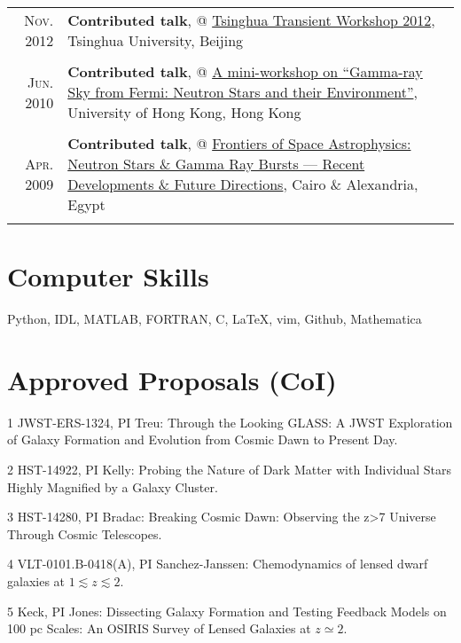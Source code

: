\documentclass[letterpaper,12pt]{article}
\newcommand{\textwrap}{5.3in}
\begin{document}
\begin{longtable}{r|p{\textwrap}}
    \textsc{Nov. 2012}   &   \textbf{Contributed talk}, @ \href{http://www.phys.tsinghua.edu.cn/publish/phy/5287/2012/20121102084855753317440/20121102084855753317440_.html}{Tsinghua Transient Workshop 2012}, Tsinghua University, Beijing   \\
    \multicolumn{2}{c}{} \\

    \textsc{Jun. 2010}   &   \textbf{Contributed talk}, @ \href{http://www.physics.hku.hk/~astro/2010Astro/Index.htm}{A mini-workshop on ``Gamma-ray Sky from Fermi: Neutron Stars and their Environment''}, University of Hong Kong, Hong Kong   \\
    \multicolumn{2}{c}{} \\

    \textsc{Apr. 2009}   &   \textbf{Contributed talk}, @ \href{http://www.ns-grb.com/index0.html}{Frontiers of Space Astrophysics: Neutron Stars \& Gamma Ray Bursts --- Recent Developments \& Future Directions}, Cairo \& Alexandria, Egypt     \\
    \multicolumn{2}{c}{}

\end{longtable}
\endgroup

\section{Computer Skills}
\hspace*{0em}
Python, IDL, MATLAB, FORTRAN, C, \LaTeX, vim, Github, Mathematica


\section{Approved Proposals (CoI)}

\begin{list}{}{\leftmargin=1.7em}
    \item[1] JWST-ERS-1324, PI Treu: Through the Looking GLASS: A JWST Exploration of Galaxy Formation and Evolution from Cosmic Dawn to Present Day.
    \item[2] HST-14922, PI Kelly: Probing the Nature of Dark Matter with Individual Stars Highly Magnified by a Galaxy Cluster.
    \item[3] HST-14280, PI Bradac: Breaking Cosmic Dawn: Observing the z>7 Universe Through Cosmic Telescopes.
    \item[4] VLT-0101.B-0418(A), PI Sanchez-Janssen: Chemodynamics of lensed dwarf galaxies at $1\lesssim z\lesssim 2$.
    \item[5] Keck, PI Jones: Dissecting Galaxy Formation and Testing Feedback Models on 100 pc Scales: An OSIRIS Survey of Lensed Galaxies at $z\simeq2$.
\end{list}
\end{document}

